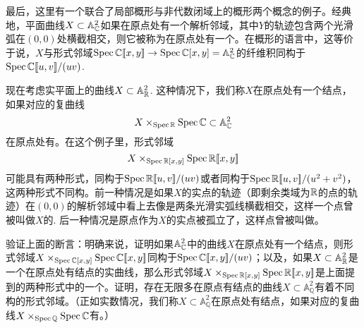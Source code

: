 最后，这里有一个联合了局部概形与非代数闭域上的概形两个概念的例子。经典地，平面曲线$X\subset \mathbb{A}_{\mathbb{C}}^2$如果在原点处有一个解析邻域，其中$Y$的轨迹包含两个光滑弧在$(0,0)$处横截相交，则它被称为在原点处有一个。在概形的语言中，这等价于说，$X$与形式邻域$\operatorname{Spec} \mathbb{C}[\![x,y]\!]\to \operatorname{Spec} \mathbb{C}[x,y]=\mathbb{A}_{\mathbb{C}}^2$的纤维积同构于$\operatorname{Spec} \mathbb{C}[\![u,v]\!]/(uv)$.

现在考虑实平面上的曲线$X\subset \mathbb{A}_{\mathbb{R}}^2$. 这种情况下，我们称$X$在原点处有一个结点，如果对应的复曲线
\[
	X\times_{\operatorname{Spec} \mathbb{R}}\operatorname{Spec} \mathbb{C} \subset \mathbb{A}_{\mathbb{C}}^2
\]
在原点处有。在这个例子里，形式邻域
\[
	X\times_{\operatorname{Spec} \mathbb{R}[x,y]}\operatorname{Spec} \mathbb{R}[\![x,y]\!]
\]
可能具有两种形式，同构于$\operatorname{Spec} \mathbb{R}[\![u,v]\!]/(uv)$或者同构于$\operatorname{Spec} \mathbb{R}[\![u,v]\!]/(u^2+v^2)$，这两种形式不同构。前一种情况是如果$X$的实点的轨迹（即剩余类域为$\mathbb{R}$的点的轨迹）在$(0,0)$的解析邻域中看上去像是两条光滑实弧线横截相交，这样一个点曾被叫做$X$的. 后一种情况是原点作为$X$的实点被孤立了，这样点曾被叫做。

\begin{exe}
	验证上面的断言：明确来说，证明如果$\mathbb{A}_{\mathbb{C}}^2$中的曲线$X$在原点处有一个结点，则形式邻域$X\times_{\operatorname{Spec} \mathbb{C}[x,y]}\operatorname{Spec} \mathbb{C}[\![x,y]\!]$同构于$\operatorname{Spec}\mathbb{C}[\![x,y]\!]/(uv)$；以及，如果$X\subset \mathbb{A}_{\mathbb{R}}^2$是一个在原点处有结点的实曲线，那么形式邻域$X\times_{\operatorname{Spec} \mathbb{R}[x,y]}\operatorname{Spec} \mathbb{R}[\![x,y]\!]$是上面提到的两种形式中的一个。证明，存在无限多在原点有结点的曲线$X\subset \mathbb{A}_{\mathbb{Q}}^2$有着不同构的形式邻域。（正如实数情况，我们称$X\subset \mathbb{A}^2_\mathbb{Q}$在原点处有结点，如果对应的复曲线$X\times_{\operatorname{Spec} \mathbb{Q}} \operatorname{Spec} \mathbb{C}$有。）
\end{exe}